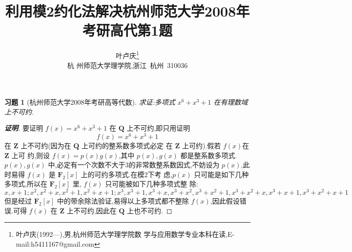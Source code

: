 \documentclass[twoside,11pt]{article}
\newtheorem*{exercise}{习题}
\begin{document}
\title{\huge{\bf{利用模2约化法解决杭州师范大学2008年考研高代第1题}}}
\author{\small{叶卢庆\footnote{叶卢庆(1992---),男,杭州师范大学理学院数
      学与应用数学专业本科在读,E-mail:h5411167@gmail.com}}\\{\small{杭
      州师范大学理学院,浙江~杭州~310036}}} \date{}
\maketitle


\vspace{30pt} %
\begin{exercise}[杭州师范大学2008年考研高等代数]
  求证:多项式 $x^6+x^3+1$ 在有理数域上不可约.
\end{exercise}
\begin{proof}[\textbf{证明}]
  要证明 $f(x)=x^6+x^3+1$ 在 $\mathbf{Q}$ 上不可约,即只用证明
$$
f(x)=x^6+x^3+1
$$
在 $\mathbf{Z}$ 上不可约(因为在 $\mathbf{Q}$ 上可约的整系数多项式必定
在 $\mathbf{Z}$ 上可约).假若 $f(x)$在 $\mathbf{Z}$ 上可
约,则设 $f(x)=p(x)g(x)$,其中 $p(x),g(x)$ 都是整系数多项式.$p(x),g(x)$
中,必定有一个次数不大于3的非常数整系数因式,不妨设为 $p(x)$,此时易得 $f(x)$
是 $\mathbf{F}_2[x]$ 上的可约多项式.在模2下考
虑,$p(x)$ 只可能是如下几种多项式,所以在 $\mathbf{F}_2[x]$ 里, $f(x)$ 只可能被如下几种多项式整
除:
$$
x,x+1;x^2,x^2+x,x^2+1,x^2+x+1;x^3,x^3+1,x^3+x,x^3+x^{2},x^3+x^2+1,x^3+x^2+x,x^3+x+1,x^3+x^2+x+1
$$
但是经过 $\mathbf{F}_2[x]$ 中的带余除法验证,易得以上多项式都不整除 $f(x)$,因此假设错误.可得
$f(x)$ 在 $\mathbf{Z}$ 上不可约,因此在 $\mathbf{Q}$ 上也不可约.
\end{proof}

% 
\end{document}
